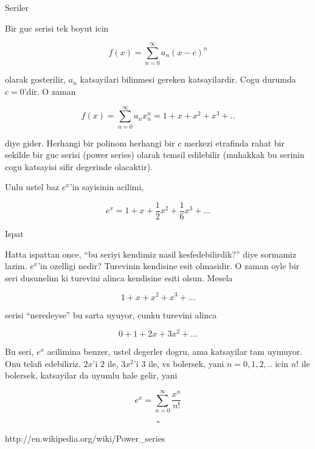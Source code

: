 \documentclass[12pt,fleqn]{article}\usepackage{../common}
\begin{document}
Seriler

Bir guc serisi tek boyut icin 

\[ f(x) = \sum _{ n=0}^{\infty} a_n (x-c)^n\]

olarak gosterilir, $a_n$ katsayilari bilinmesi gereken katsayilardir. Cogu
durumda $c=0$'dir. O zaman 

\[ f(x) = \sum _{ n=0}^{\infty} a_n x_n^n = 1+x+x^2+x^3+..\]

diye gider. Herhangi bir polinom herhangi bir $c$ merkezi etrafinda rahat
bir sekilde bir guc serisi (power series) olarak temsil edilebilir
(muhakkak bu serinin cogu katsayisi sifir degerinde olacaktir). 

Unlu ustel baz $e^x$'in sayisinin acilimi, 

\[ e^x = 1 + x + \frac{1}{2}x^2 + \frac{1}{6}x^3 + ... \]

Ispat

Hatta ispattan once, ``bu seriyi kendimiz nasil kesfedebilirdik?'' diye
sormamiz lazim. $e^x$'in ozelligi nedir? Turevinin kendisine esit
olmasidir. O zaman oyle bir seri dusunelim ki turevini alinca kendisine
esiti olsun. Mesela

\[ 1 + x + x^2 + x^3 + ... \]

serisi ``neredeyse'' bu sarta uyuyor, cunku turevini alinca 

\[ 0 + 1 + 2x + 3x^2 + ... \]

Bu seri, $e^x$ acilimina benzer, ustel degerler dogru, ama katsayilar
tam uymuyor. Onu telafi edebiliriz. $2x$'i $2$ ile, $3x^2$'i $3$ ile, vs
bolersek, yani $n=0,1,2,..$ icin $n!$ ile bolersek, katsayilar da uyumlu
hale gelir, yani 

\[ e^x = \sum _{ n=0}^{\infty} \frac{ x^n}{n!} \]

\[ \square \]

http://en.wikipedia.org/wiki/Power_series
\end{document}
